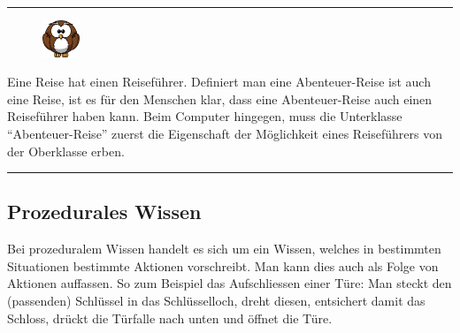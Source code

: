 \noindent\rule[1ex]{\textwidth}{1pt}
\begin{figure}
    \vspace{-14pt}
    \includegraphics[width=0.1\textwidth]{bilder/owl.png}
\end{figure}
Eine Reise hat einen Reiseführer. Definiert man eine Abenteuer-Reise ist auch eine Reise, ist es für den Menschen klar, dass eine Abenteuer-Reise auch einen Reiseführer haben kann. Beim Computer hingegen, muss die Unterklasse ``Abenteuer-Reise'' zuerst die Eigenschaft der Möglichkeit eines Reiseführers von der Oberklasse erben.\\

\noindent\rule[1ex]{\textwidth}{1pt}

\subsection{Prozedurales Wissen}
\label{subsec:prozedurales_wissen}
Bei prozeduralem Wissen handelt es sich um ein Wissen, welches in bestimmten Situationen bestimmte Aktionen vorschreibt. Man kann dies auch als Folge von Aktionen auffassen. So zum Beispiel das Aufschliessen einer Türe: Man steckt den (passenden) Schlüssel in das Schlüsselloch, dreht diesen, entsichert damit das Schloss, drückt die Türfalle nach unten und öffnet die Türe.

